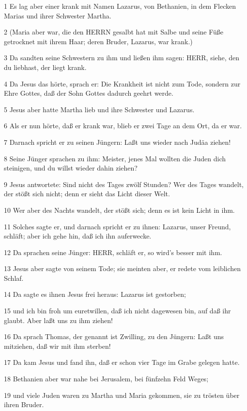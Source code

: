 \par 1 Es lag aber einer krank mit Namen Lazarus, von Bethanien, in dem Flecken Marias und ihrer Schwester Martha.
\par 2 (Maria aber war, die den HERRN gesalbt hat mit Salbe und seine Füße getrocknet mit ihrem Haar; deren Bruder, Lazarus, war krank.)
\par 3 Da sandten seine Schwestern zu ihm und ließen ihm sagen: HERR, siehe, den du liebhast, der liegt krank.
\par 4 Da Jesus das hörte, sprach er: Die Krankheit ist nicht zum Tode, sondern zur Ehre Gottes, daß der Sohn Gottes dadurch geehrt werde.
\par 5 Jesus aber hatte Martha lieb und ihre Schwester und Lazarus.
\par 6 Als er nun hörte, daß er krank war, blieb er zwei Tage an dem Ort, da er war.
\par 7 Darnach spricht er zu seinen Jüngern: Laßt uns wieder nach Judäa ziehen!
\par 8 Seine Jünger sprachen zu ihm: Meister, jenes Mal wollten die Juden dich steinigen, und du willst wieder dahin ziehen?
\par 9 Jesus antwortete: Sind nicht des Tages zwölf Stunden? Wer des Tages wandelt, der stößt sich nicht; denn er sieht das Licht dieser Welt.
\par 10 Wer aber des Nachts wandelt, der stößt sich; denn es ist kein Licht in ihm.
\par 11 Solches sagte er, und darnach spricht er zu ihnen: Lazarus, unser Freund, schläft; aber ich gehe hin, daß ich ihn auferwecke.
\par 12 Da sprachen seine Jünger: HERR, schläft er, so wird's besser mit ihm.
\par 13 Jesus aber sagte von seinem Tode; sie meinten aber, er redete vom leiblichen Schlaf.
\par 14 Da sagte es ihnen Jesus frei heraus: Lazarus ist gestorben;
\par 15 und ich bin froh um euretwillen, daß ich nicht dagewesen bin, auf daß ihr glaubt. Aber laßt uns zu ihm ziehen!
\par 16 Da sprach Thomas, der genannt ist Zwilling, zu den Jüngern: Laßt uns mitziehen, daß wir mit ihm sterben!
\par 17 Da kam Jesus und fand ihn, daß er schon vier Tage im Grabe gelegen hatte.
\par 18 Bethanien aber war nahe bei Jerusalem, bei fünfzehn Feld Weges;
\par 19 und viele Juden waren zu Martha und Maria gekommen, sie zu trösten über ihren Bruder.
